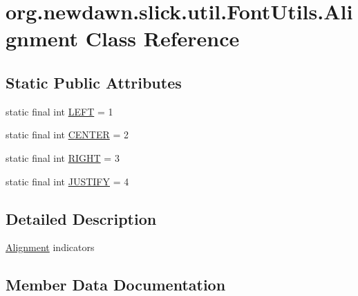 \hypertarget{classorg_1_1newdawn_1_1slick_1_1util_1_1_font_utils_1_1_alignment}{}\section{org.\+newdawn.\+slick.\+util.\+Font\+Utils.\+Alignment Class Reference}
\label{classorg_1_1newdawn_1_1slick_1_1util_1_1_font_utils_1_1_alignment}
\subsection*{Static Public Attributes}
\begin{DoxyCompactItemize}
\item 
static final int \mbox{\hyperlink{classorg_1_1newdawn_1_1slick_1_1util_1_1_font_utils_1_1_alignment_aac17e48601807e7721bfe80721db74d7}{L\+E\+FT}} = 1
\item 
static final int \mbox{\hyperlink{classorg_1_1newdawn_1_1slick_1_1util_1_1_font_utils_1_1_alignment_a81dfcec9f76ad2bdeab589f0e87888b8}{C\+E\+N\+T\+ER}} = 2
\item 
static final int \mbox{\hyperlink{classorg_1_1newdawn_1_1slick_1_1util_1_1_font_utils_1_1_alignment_ad0a4c8a5f1eace92dd362d6f0031eb7c}{R\+I\+G\+HT}} = 3
\item 
static final int \mbox{\hyperlink{classorg_1_1newdawn_1_1slick_1_1util_1_1_font_utils_1_1_alignment_a9648d716b8d341520421a6f6a5b450db}{J\+U\+S\+T\+I\+FY}} = 4
\end{DoxyCompactItemize}


\subsection{Detailed Description}
\mbox{\hyperlink{classorg_1_1newdawn_1_1slick_1_1util_1_1_font_utils_1_1_alignment}{Alignment}} indicators 

\subsection{Member Data Documentation}
\mbox{\label{classorg_1_1newdawn_1_1slick_1_1util_1_1_font_utils_1_1_alignment_a81dfcec9f76ad2bdeab589f0e87888b8}} 
